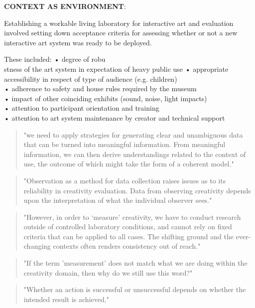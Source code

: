 \textbf{CONTEXT AS ENVIRONMENT}: \citep[p.21]{Candy2012}

Establishing a workable living laboratory for interactive art and evaluation involved setting down acceptance criteria for assessing whether or not a new interactive art system was ready to be deployed.

These included:
•	degree of robu\\stness of the art system in expectation of heavy public use
•	appropriate accessibility in respect of type of audience (e.g. children)\\
•	adherence to safety and house rules required by the museum\\
•	impact of other coinciding exhibits (sound, noise, light impacts)\\
•	attention to participant orientation and training\\
•	attention to art system maintenance by creator and technical support

\begin{quote}
"we need to apply strategies for generating clear and unambiguous data that can be turned into meaningful information. From meaningful information, we can then derive understandings related to the context of use, the outcome of which might take the form of a coherent model." \citep[p.21]{Candy2012}
\end{quote}

\begin{quote}
"Observation as a method for data collection raises issues as to its reliability in creativity evaluation. Data from observing creativity depends upon the interpretation of what the individual observer sees." \citep[p.22]{Candy2012}
\end{quote}

\begin{quote}
"However, in order to ‘measure’ creativity, we have to conduct research outside of controlled laboratory conditions, and cannot rely on fixed criteria that can be applied to all cases. The shifting ground and the ever-changing contexts often renders consistency out of reach." \citep[p.22]{Candy2012}
\end{quote}

\begin{quote}
"If the term 'measurement' does not match what we are doing within the creativity domain, then why do we still use this word?" \citep[p.22]{Candy2012}
\end{quote}

\begin{quote}
"Whether an action is successful or unsuccessful depends on whether the intended result is achieved." \citep[p.23]{Candy2012}
\end{quote}

